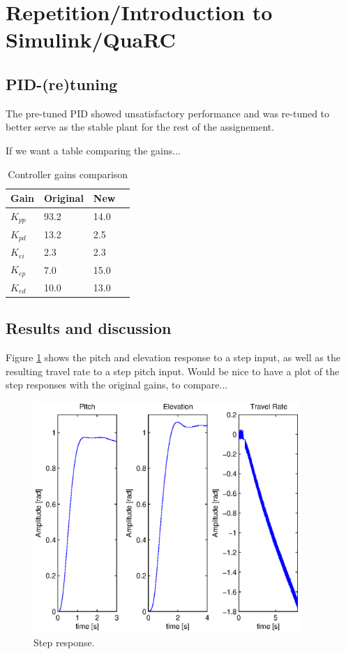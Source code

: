 \section{Repetition/Introduction to Simulink/QuaRC}\label{sec:prob1}
\label{text:problem1}

\subsection{PID-(re)tuning}
The pre-tuned PID showed unsatisfactory performance and was re-tuned to better serve as the stable plant for the rest of the assignement. 

If we want a table comparing the gains...
\begin{table}[hp]
	\centering
	\caption{Controller gains comparison}
	\begin{tabular}{llll}
		\hline
		Gain & Original & New \\
		\hline
		$K_{pp}$ & 93.2 & 14.0 \\
		$K_{pd}$ & 13.2 & 2.5 \\
		$K_{ei}$ & 2.3 & 2.3 \\
		$K_{ep}$ & 7.0 & 15.0 \\
		$K_{ed}$ & 10.0 & 13.0 \\
	\end{tabular}
	\label{tab:gains}
\end{table}

\subsection{Results and discussion}

Figure \ref{fig:step_response} shows the pitch and elevation response to a step input, as well as the resulting travel rate to a step pitch input.
Would be nice to have a plot of the step responses with the original gains, to compare...

\begin{figure}[hp]
	\centering
		\includegraphics[width=0.9\textwidth]{figures/1/step_response.eps}
	\caption{Step response.}
	\label{fig:step_response}
\end{figure}


